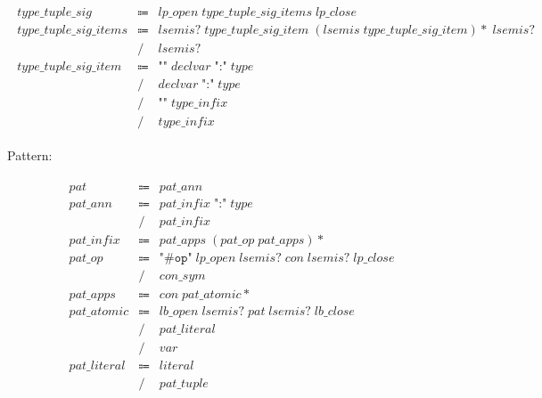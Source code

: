 \begin{align*}
    \begin{array}{rcll}
        \mathit{type\_tuple\_sig}
        &\Coloneq &\mathit{lp\_open}\; \mathit{type\_tuple\_sig\_items}\; \mathit{lp\_close} \\
        \mathit{type\_tuple\_sig\_items}
        &\Coloneq &\mathit{lsemis}{?}\; \mathit{type\_tuple\_sig\_item}\; (\mathit{lsemis}\; \mathit{type\_tuple\_sig\_item}){*}\; \mathit{lsemis}{?} \\
        &\mathrel{/} &\mathit{lsemis}{?} \\
        \mathit{type\_tuple\_sig\_item}
        &\Coloneq &\texttt{"\^{}"}\; \mathit{declvar}\; \texttt{":"}\; \mathit{type} \\
        &\mathrel{/} &\mathit{declvar}\; \texttt{":"}\; \mathit{type} \\
        &\mathrel{/} &\texttt{"\^{}"}\; \mathit{type\_infix} \\
        &\mathrel{/} &\mathit{type\_infix}
    \end{array}
\end{align*}

Pattern:

\begin{align*}
    \begin{array}{rcll}
        \mathit{pat}
        &\Coloneq &\mathit{pat\_ann} \\
        \mathit{pat\_ann}
        &\Coloneq &\mathit{pat\_infix}\; \texttt{":"}\; \mathit{type} \\
        &\mathrel{/} &\mathit{pat\_infix} \\
        \mathit{pat\_infix}
        &\Coloneq &\mathit{pat\_apps}\; (\mathit{pat\_op}\; \mathit{pat\_apps}){*} \\
        \mathit{pat\_op}
        &\Coloneq &\texttt{"\#op"}\; \mathit{lp\_open}\; \mathit{lsemis}{?}\; \mathit{con}\; \mathit{lsemis}{?}\; \mathit{lp\_close} \\
        &\mathrel{/} &\mathit{con\_sym} \\
        \mathit{pat\_apps}
        &\Coloneq &\mathit{con}\; \mathit{pat\_atomic}{*} \\
        \mathit{pat\_atomic}
        &\Coloneq &\mathit{lb\_open}\; \mathit{lsemis}{?}\; \mathit{pat}\; \mathit{lsemis}{?}\; \mathit{lb\_close} \\
        &\mathrel{/} &\mathit{pat\_literal} \\
        &\mathrel{/} &\mathit{var} \\
        \mathit{pat\_literal}
        &\Coloneq &\mathit{literal} \\
        &\mathrel{/} &\mathit{pat\_tuple}
    \end{array}
\end{align*}

